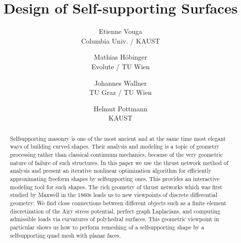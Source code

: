 \documentclass[review]{acmsiggraph}
\title{Design of Self-supporting Surfaces}
\author{
	Etienne Vouga
	\\ Columbia Univ. / KAUST
\and
	Mathias H\"obinger
	\\ Evolute / TU Wien
\and
	Johannes Wallner
	\\ TU Graz / TU Wien
\and 
	Helmut Pottmann
	\\ KAUST
}
\begin{document}



\maketitle


\begin{abstract} Self\dash supporting masonry is one of the most ancient 
and at the same time most elegant ways of building curved shapes. Their 
analysis and modeling is a topic of geometry processing rather than 
classical continuum mechanics, because of the very geometric nature of 
failure of such structures. In this paper we use the thrust network method 
of analysis and present an iterative nonlinear optimization algorithm for 
efficiently approximating freeform shapes by self\dash supporting ones. 
This provides an interactive modeling tool for such shapes. The rich 
geometry of thrust networks which was first studied by Maxwell in the 
1860s leads us to new viewpoints of discrete differential geometry: We 
find close connections between different objects such as a finite\dash 
element discretization of the Airy stress potential, perfect graph 
Laplacians, and computing admissible loads via curvatures of polyhedral 
surfaces. This geometric viewpoint in particular shows us how to perform 
remeshing of a self\dash supporting shape by a self\dash supporting
quad mesh with planar faces.

\end{abstract}
\end{document}
